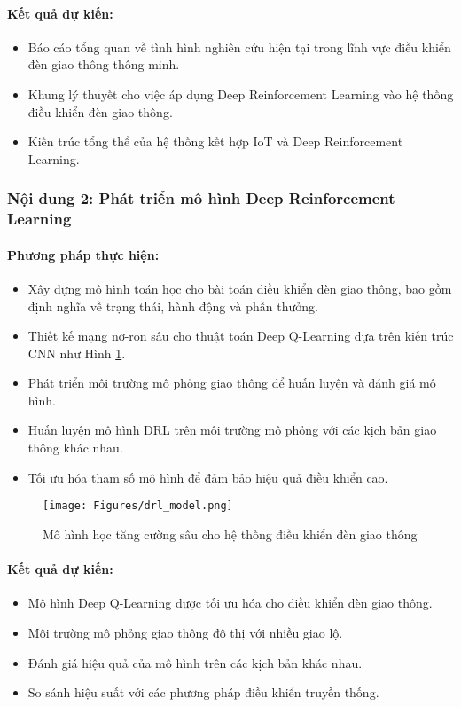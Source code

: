 \documentclass[letterpaper]{article}
\begin{document}
\paragraph{Kết quả dự kiến:}
\begin{itemize}
    \item Báo cáo tổng quan về tình hình nghiên cứu hiện tại trong lĩnh vực điều khiển đèn giao thông thông minh.
    \item Khung lý thuyết cho việc áp dụng Deep Reinforcement Learning vào hệ thống điều khiển đèn giao thông.
    \item Kiến trúc tổng thể của hệ thống kết hợp IoT và Deep Reinforcement Learning.
\end{itemize}

\subsubsection{Nội dung 2: Phát triển mô hình Deep Reinforcement Learning}

\paragraph{Phương pháp thực hiện:}
\begin{itemize}
    \item Xây dựng mô hình toán học cho bài toán điều khiển đèn giao thông, bao gồm định nghĩa về trạng thái, hành động và phần thưởng.
    \item Thiết kế mạng nơ-ron sâu cho thuật toán Deep Q-Learning dựa trên kiến trúc CNN như Hình \ref{fig:drl-model}.
    \item Phát triển môi trường mô phỏng giao thông để huấn luyện và đánh giá mô hình.
    \item Huấn luyện mô hình DRL trên môi trường mô phỏng với các kịch bản giao thông khác nhau.
    \item Tối ưu hóa tham số mô hình để đảm bảo hiệu quả điều khiển cao.
\end{itemize}

\begin{figure}[!hbt]
    \centering
    \texttt{[image: Figures/drl\_model.png]}
    \caption{Mô hình học tăng cường sâu cho hệ thống điều khiển đèn giao thông \cite{kovari2022deep}}
    \label{fig:drl-model}
\end{figure}

\paragraph{Kết quả dự kiến:}
\begin{itemize}
    \item Mô hình Deep Q-Learning được tối ưu hóa cho điều khiển đèn giao thông.
    \item Môi trường mô phỏng giao thông đô thị với nhiều giao lộ.
    \item Đánh giá hiệu quả của mô hình trên các kịch bản khác nhau.
    \item So sánh hiệu suất với các phương pháp điều khiển truyền thống.
\end{itemize}
\end{document}
